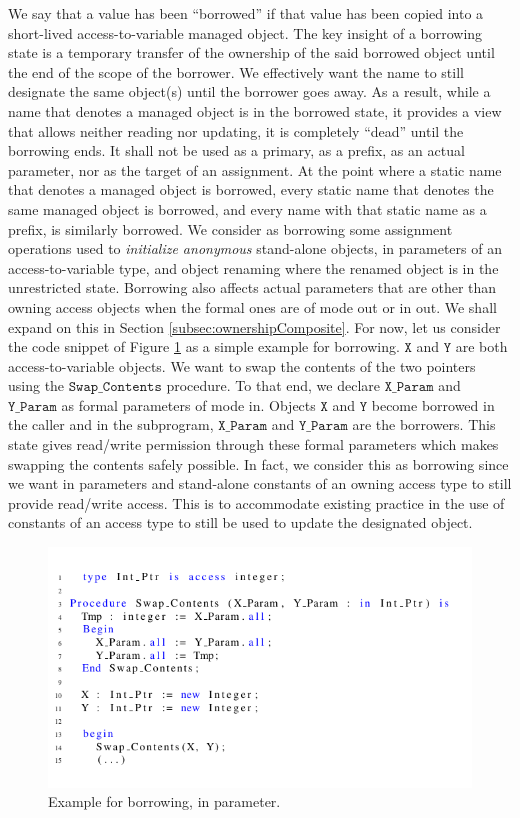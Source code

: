 \documentclass{llncs}
\newcommand\var[1]{\ensuremath{\mathtt{#1}}}
\newcommand{\keyword}[1]{\textsf{#1}}
\begin{document}
We say that a value has been ``borrowed'' if that value has been copied into a short-lived access-to-variable managed object.
The key insight of a borrowing state is a temporary transfer of the ownership of the said borrowed object until the end of the scope of the borrower.
We effectively want the name to still designate the same object(s) until the borrower goes away. As a result, while a name that denotes a managed object
is in the borrowed state, it provides a view that allows neither reading nor updating, it is completely ``dead'' until the borrowing ends. It shall not
be used as a primary, as a prefix, as an actual parameter, nor as the target of an assignment. At the point where a static name that denotes a managed
object is borrowed, every static name that denotes the same managed object is borrowed, and every name with that static name as a prefix, is similarly borrowed.
We consider as borrowing some assignment operations used to \textit{initialize anonymous} stand-alone objects, \keyword{in} parameters of an access-to-variable
type, and object renaming where the renamed object is in the unrestricted state. Borrowing also affects actual parameters that are other than owning access objects
when the formal ones are of mode \keyword{out} or \keyword{in out}. We shall expand on this in Section \ref{subsec:ownershipComposite}. For now, let us consider the
code snippet of Figure \ref{fig:borrow_ex1} as a simple example for borrowing. \var{X} and \var{Y} are both access-to-variable objects. We want to swap the contents of the two
pointers using the \var{Swap\_Contents} procedure. To that end, we declare \var{X\_Param} and \var{Y\_Param} as formal parameters of mode \keyword{in}. Objects \var{X} and \var{Y} become borrowed
in the caller and in the subprogram, \var{X\_Param} and \var{Y\_Param} are the borrowers. This state gives read/write permission through these formal parameters which makes swapping
the contents safely possible. In fact, we consider this as borrowing since we want \keyword{in} parameters and stand-alone constants of an owning access type to still
provide read/write access. This is to accommodate existing practice in the use of constants of an access type to still be used to update the designated object.

\begin{figure}[htb!]
\centering
   \includegraphics[width=\columnwidth]{borrow_ex1}
   \caption{Example for borrowing, \keyword{in} parameter.}
   \label{fig:borrow_ex1}
\end{figure}
\end{document}
